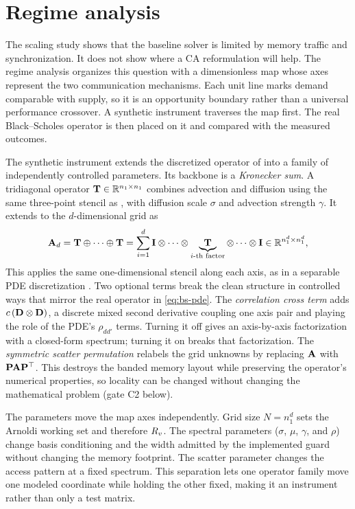\section{Regime analysis}\label{sec:regime}

The scaling study shows that the baseline solver is limited by memory traffic and synchronization. It does not show where a CA reformulation will help. The regime analysis organizes this question with a dimensionless map whose axes represent the two communication mechanisms. Each unit line marks demand comparable with supply, so it is an opportunity boundary rather than a universal performance crossover. A synthetic instrument traverses the map first. The real Black--Scholes operator is then placed on it and compared with the measured outcomes.

The synthetic instrument extends the discretized operator of  into a family of independently controlled parameters. Its backbone is a \emph{Kronecker sum}. A tridiagonal operator $\mathbf{T}\in\mathbb{R}^{n_1\times n_1}$ combines advection and diffusion using the same three-point stencil as , with diffusion scale $\sigma$ and advection strength $\gamma$. It extends to the $d$-dimensional grid as
\[
\mathbf{A}_d = \mathbf{T} \oplus \cdots \oplus \mathbf{T}
= \sum_{i=1}^{d} \mathbf{I} \otimes \cdots \otimes
  \underbrace{\mathbf{T}}_{i\text{-th factor}} \otimes \cdots \otimes \mathbf{I}
\in \mathbb{R}^{n_1^d \times n_1^d},
\]
This applies the same one-dimensional stencil along each axis, as in a separable PDE discretization \cite{golub-vanloan-2013}. Two optional terms break the clean structure in controlled ways that mirror the real operator in \eqref{eq:bs-pde}. The \emph{correlation cross term} adds $c\,(\mathbf{D}\otimes\mathbf{D})$, a discrete mixed second derivative coupling one axis pair and playing the role of the PDE's $\rho_{dd'}$ terms. Turning it off gives an axis-by-axis factorization with a closed-form spectrum; turning it on breaks that factorization. The \emph{symmetric scatter permutation} relabels the grid unknowns by replacing $\mathbf{A}$ with $\mathbf{P}\mathbf{A}\mathbf{P}^\top$. This destroys the banded memory layout while preserving the operator's numerical properties, so locality can be changed without changing the mathematical problem (gate C2 below).

The parameters move the map axes independently. Grid size $N=n_1^d$ sets the Arnoldi working set and therefore $R_v$. The spectral parameters ($\sigma$, $\mu$, $\gamma$, and $\rho$) change basis conditioning and the width admitted by the implemented guard without changing the memory footprint. The scatter parameter changes the access pattern at a fixed spectrum. This separation lets one operator family move one modeled coordinate while holding the other fixed, making it an instrument rather than only a test matrix.

